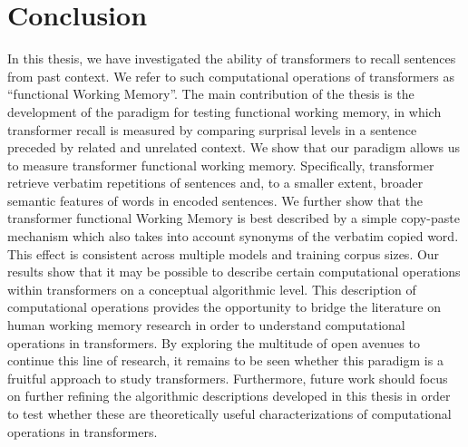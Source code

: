 

\section{Conclusion}

In this thesis, we have investigated the ability of transformers to recall sentences from past context. We refer to such  computational operations of transformers as ``functional Working Memory''.
The main contribution of the thesis is the development of the paradigm for testing functional working memory, in which transformer recall is measured by comparing surprisal levels in a sentence preceded by related and unrelated context.
We show that our paradigm allows us to measure transformer functional working memory. Specifically,  transformer retrieve verbatim repetitions of sentences and, to a smaller extent, broader semantic features of words in encoded sentences.
We further show that the transformer functional Working Memory is best described by a simple copy-paste mechanism which also takes into account synonyms of the verbatim copied word.
This effect is consistent across multiple models and training corpus sizes.
Our results show that it may be possible to describe certain computational operations within transformers on a conceptual algorithmic level.
This description of computational operations provides the opportunity to bridge the literature on human working memory research in order to understand computational operations in transformers.
By exploring the multitude of open avenues to continue this line of research, it remains to be seen whether this paradigm is a fruitful approach to study transformers. Furthermore, future work should focus on further refining the algorithmic descriptions developed in this thesis in order to test whether these are theoretically useful characterizations of computational operations in transformers.

\newpage

